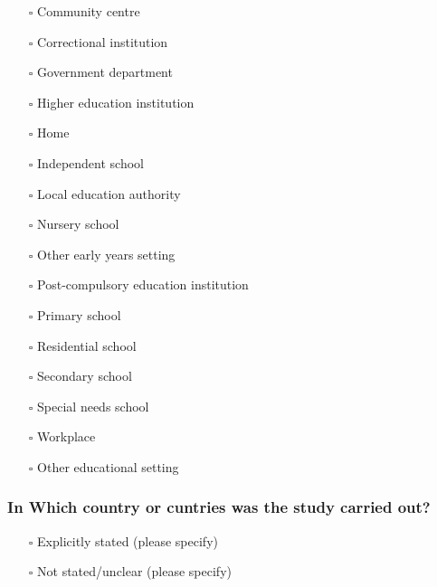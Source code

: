 \documentclass[
  doc, a4paper]{apa7}
\providecommand{\tightlist}{%
  \setlength{\itemsep}{0pt}\setlength{\parskip}{0pt}}
\begin{document}
\begin{itemize}
\tightlist
\item[$\square$]
  Community centre\\
\item[$\square$]
  Correctional institution\\
\item[$\square$]
  Government department\\
\item[$\square$]
  Higher education institution\\
\item[$\square$]
  Home\\
\item[$\square$]
  Independent school\\
\item[$\square$]
  Local education authority\\
\item[$\square$]
  Nursery school\\
\item[$\square$]
  Other early years setting\\
\item[$\square$]
  Post-compulsory education institution\\
\item[$\square$]
  Primary school\\
\item[$\square$]
  Residential school\\
\item[$\square$]
  Secondary school\\
\item[$\square$]
  Special needs school\\
\item[$\square$]
  Workplace\\
\item[$\square$]
  Other educational setting
\end{itemize}

\subsubsection{In Which country or cuntries was the study carried out?}\label{in-which-country-or-cuntries-was-the-study-carried-out}

\begin{itemize}
\tightlist
\item[$\square$]
  Explicitly stated (please specify)\\
\item[$\square$]
  Not stated/unclear (please specify)
\end{itemize}
\end{document}
